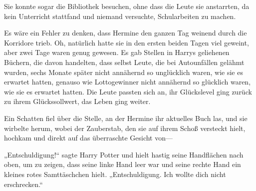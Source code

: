 Sie konnte sogar die Bibliothek besuchen, ohne dass die Leute sie anstarrten, da kein Unterricht stattfand und niemand versuchte, Schularbeiten zu machen.

Es wäre ein Fehler zu denken, dass Hermine den ganzen Tag weinend durch die Korridore trieb. Oh, natürlich hatte sie in den ersten beiden Tagen viel geweint, aber zwei Tage waren genug gewesen. Es gab Stellen in Harrys geliehenen Büchern, die davon handelten, dass selbst Leute, die bei Autounfällen gelähmt wurden, sechs Monate später nicht annähernd so unglücklich waren, wie sie es erwartet hatten, genauso wie Lottogewinner nicht annähernd so glücklich waren, wie sie es erwartet hatten. Die Leute passten sich an, ihr Glückslevel ging zurück zu ihrem Glückssollwert, das Leben ging weiter.

Ein Schatten fiel über die Stelle, an der Hermine ihr aktuelles Buch las, und sie wirbelte herum, wobei der Zauberstab, den sie auf ihrem Schoß versteckt hielt, hochkam und direkt auf das überraschte Gesicht von—

„Entschuldigung!“ sagte Harry Potter und hielt hastig seine Handflächen nach oben, um zu zeigen, dass seine linke Hand leer war und seine rechte Hand ein kleines rotes Samttäschchen hielt. „Entschuldigung. Ich wollte dich nicht erschrecken.“

